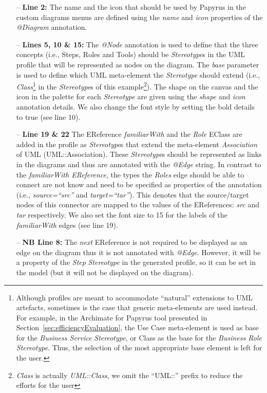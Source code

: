 \begin{itemize}
	\item[--] \textbf{Line 2:} The name and the icon that should be used by Papyrus in the custom diagrams menus are defined using the \textit{name} and \textit{icon} properties of the \textit{@Diagram} annotation.
	\item[--] \textbf{Lines 5, 10 \& 15:} The \textit{@Node} annotation is used to define that the three concepts (i.e., Steps, Roles and Tools) should be \textit{Stereotype}s in the UML profile that will be represented as nodes on the diagram. 
	The \textit{base} parameter is used to define which UML meta-element the \textit{Stereotype} should extend (i.e., \textit{Class}\footnote{Although profiles are meant to accommodate ``natural'' extensions to UML artefacts, sometimes is the case that generic meta-elements are used instead. 
	For example, in the Archimate for Papyrus tool presented in Section~\ref{sec:efficiencyEvaluation}, the Use Case meta-element is used as base for the \textit{Business Service} \textit{Stereotype}, or Class as the base for the \textit{Business Role} \textit{Stereotype}. 
	Thus, the selection of the most appropriate base element is left for the user.} in the \textit{Stereotype}s of this example\footnote{\textit{Class} is actually \textit{UML::Class}, we omit the ``UML::'' prefix to reduce the efforts for the user}). The shape on the canvas and the icon in the palette for each \textit{Stereotype} are given using the \textit{shape} and \textit{icon} annotation details. We also change the font style by setting the bold details to true (see line 10).
	\item[--] \textbf{Line 19 \& 22} The EReference \textit{familiarWith} and the \textit{Role} EClass are added in the profile as \textit{Stereotype}s that extend the meta-element \textit{Association} of UML (UML::Association). 
	These \textit{Stereotype}s should be represented as links in the diagrams and thus are annotated with the \textit{@Edge} string.
	In contrast to the \textit{familiarWith EReference}, the types the 
	\textit{Roles} edge should be able to connect are not know and need to be 
	specified as properties of the annotation (i.e., \textit{source=``src''} 
	and \textit{target=``tar''}). 
	This denotes that the source/target nodes of this connector are mapped to the values of the
	EReferences: \textit{src} and \textit{tar} respectively. We also set the font size to 15 for the labels of the \textit{familiarWith} edges (see line 19).
	\item[--] \textbf{NB Line 8:} The \textit{next} EReference is not required to be displayed as an edge on the diagram thus it is not annotated with \emph{@Edge}. 
	However, it will be a property of the \textit{Step} \textit{Stereotype} in the generated profile, so it can be set in the model (but it will not be displayed on the diagram).
\end{itemize}


